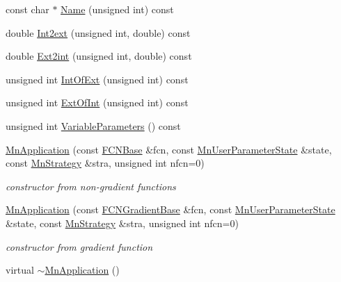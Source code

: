 \begin{DoxyCompactItemize}
\item 
const char $\ast$ \mbox{\hyperlink{classROOT_1_1Minuit2_1_1MnApplication_af970f4c896be2d56b2bfb33a8e6e33c9}{Name}} (unsigned int) const
\item 
double \mbox{\hyperlink{classROOT_1_1Minuit2_1_1MnApplication_a1ca8337823e271c40f05f6da6ea8e231}{Int2ext}} (unsigned int, double) const
\item 
double \mbox{\hyperlink{classROOT_1_1Minuit2_1_1MnApplication_a8c9379939f201ea95f32a2f1de575fca}{Ext2int}} (unsigned int, double) const
\item 
unsigned int \mbox{\hyperlink{classROOT_1_1Minuit2_1_1MnApplication_a7911389abce948da10dd82a8a172afd5}{Int\+Of\+Ext}} (unsigned int) const
\item 
unsigned int \mbox{\hyperlink{classROOT_1_1Minuit2_1_1MnApplication_a61dc63d2a6320aae96867ad57918c496}{Ext\+Of\+Int}} (unsigned int) const
\item 
unsigned int \mbox{\hyperlink{classROOT_1_1Minuit2_1_1MnApplication_afc0ad887758b1609cbcae1c8b6a5a467}{Variable\+Parameters}} () const
\item 
\mbox{\hyperlink{classROOT_1_1Minuit2_1_1MnApplication_ac3bea3d025068f8bc7d8a6701f23aa81}{Mn\+Application}} (const \mbox{\hyperlink{classROOT_1_1Minuit2_1_1FCNBase}{F\+C\+N\+Base}} \&fcn, const \mbox{\hyperlink{classROOT_1_1Minuit2_1_1MnUserParameterState}{Mn\+User\+Parameter\+State}} \&state, const \mbox{\hyperlink{classROOT_1_1Minuit2_1_1MnStrategy}{Mn\+Strategy}} \&stra, unsigned int nfcn=0)
\begin{DoxyCompactList}\small\item\em constructor from non-\/gradient functions \end{DoxyCompactList}\item 
\mbox{\hyperlink{classROOT_1_1Minuit2_1_1MnApplication_a07b6eb3c240c0d2360d466ab1f1a85ec}{Mn\+Application}} (const \mbox{\hyperlink{classROOT_1_1Minuit2_1_1FCNGradientBase}{F\+C\+N\+Gradient\+Base}} \&fcn, const \mbox{\hyperlink{classROOT_1_1Minuit2_1_1MnUserParameterState}{Mn\+User\+Parameter\+State}} \&state, const \mbox{\hyperlink{classROOT_1_1Minuit2_1_1MnStrategy}{Mn\+Strategy}} \&stra, unsigned int nfcn=0)
\begin{DoxyCompactList}\small\item\em constructor from gradient function \end{DoxyCompactList}\item 
virtual \mbox{\hyperlink{classROOT_1_1Minuit2_1_1MnApplication_ab8f38ab869bbfe082a2dbcefe1fb19de}{$\sim$\+Mn\+Application}} ()

\end{DoxyCompactItemize}
